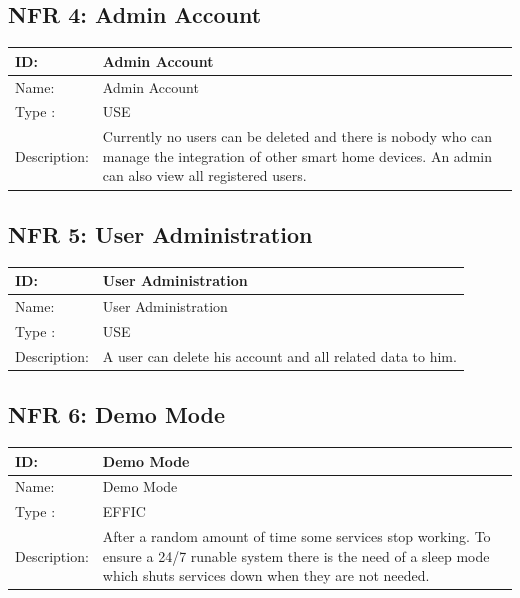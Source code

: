 \documentclass[12pt]{article}
\theoremstyle{definition}
\begin{document}
\subsection{NFR 4: Admin Account}
\begin{tabular}{|p{.2\linewidth}|p{.65\linewidth}|}
\hline 
ID: & Admin Account \\ \hline
Name: & Admin Account \\ \hline
Type	: & USE\\ \hline
Description: &  Currently no users can be deleted and there is nobody who can manage the integration of other smart home devices. An admin can also view all registered users.\\ \hline
\end{tabular}

\subsection{NFR 5: User Administration}
\begin{tabular}{|p{.2\linewidth}|p{.65\linewidth}|}
\hline 
ID: & User Administration \\ \hline
Name: & User Administration \\ \hline
Type	: & USE\\ \hline
Description: & A user can delete his account and all related data to him. \\ \hline
\end{tabular}

\subsection{NFR 6: Demo Mode}
\begin{tabular}{|p{.2\linewidth}|p{.65\linewidth}|}
\hline 
ID: & Demo Mode \\ \hline
Name: & Demo Mode \\ \hline
Type	: & EFFIC\\ \hline
Description: & After a random amount of time some services stop working. To ensure a 24/7 runable system there is the need of a sleep mode which shuts services down when they are not needed. \\ \hline
\end{tabular}
\end{document}
